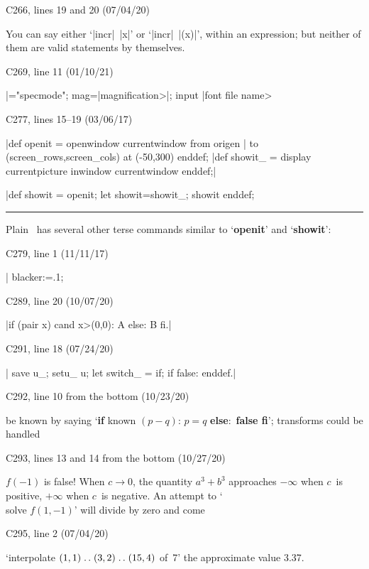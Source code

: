 \bugonpage C266, lines 19 and 20 (07/04/20)

\ninepoint\noindent
You can say either `|incr|~|x|' or `|incr|~|(x)|', within
an expression; but neither of them are valid statements by themselves.

\bugonpage C269, line 11 (01/10/21)

\ninepoint\indent
|\smode="specmode"; mag=|\<magnification>|; input |\<font file name>

\bugonpage C277, lines 15--19 (03/06/17)

\ninepoint\noindent
|def openit = openwindow currentwindow from origen    %
\noindent
| to (screen_rows,screen_cols) at (-50,300) enddef;   %
\noindent
|def showit_ = display currentpicture inwindow currentwindow enddef;|\par
\noindent
|def showit = openit; let showit=showit_; showit enddef; %
\kern3pt\hrule\medskip\noindent
Plain \MF\ has several other terse commands
similar to `{\bf openit}' and `{\bf showit}':

\bugonpage C279, line 1 (11/11/17)

\ninepoint\noindent
| blacker:=.1;                   %

\bugonpage C289, line 20 (10/07/20)

\ninepoint\indent
|if {{(pair x) cand x>(0,0)}}: A else: B fi.|

\bugonpage C291, line 18 (07/24/20)

\ninepoint\indent
| save u_; setu_ u; let switch_ = if; if false: enddef.|

\bugonpage C292, line 10 from the bottom (10/23/20)

\ninepoint\noindent
be known by saying `{\bf if} known $(p-q)$: $p=q$ {\bf else}:~{\bf false fi}';
transforms could be handled\cutpar

\bugonpage C293, lines 13 and 14 from the bottom (10/27/20)

\ninepoint\noindent
$f(-1)$ is false! When $c\rightarrow0$, the quantity $a^3+b^3$
approaches $-\infty$ when $c$~is positive, $+\infty$ when $c$~is
negative. An attempt to `\\{solve} $f(1,-1)$' will divide by zero and
come\cutpar

\bugonpage C295, line 2 (07/04/20)

\ninepoint\noindent
`interpolate $(1,1)\mathrel{.\,.}(3,2)\mathrel{.\,.}(15,4)$ of~7' the approximate value 3.37.

